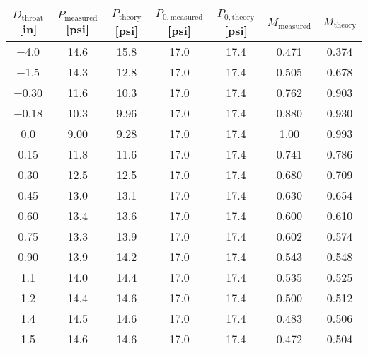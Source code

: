\begin{tabular}{ccccccc}
\toprule
$D_\text{throat}$ [\unit{in}] & $P_\text{measured}$ [\unit{psi}] & $P_\text{theory}$ [\unit{psi}] & $P_{0,\text{measured}}$ [\unit{psi}] & $P_{0,\text{theory}}$ [\unit{psi}] & $M_\text{measured}$ & $M_\text{theory}$ \\
\midrule
\num{-4.0} & \num{14.6} & \num{15.8} & \num{17.0} & \num{17.4} & \num{0.471} & \num{0.374} \\ 
\num{-1.5} & \num{14.3} & \num{12.8} & \num{17.0} & \num{17.4} & \num{0.505} & \num{0.678} \\ 
\num{-0.30} & \num{11.6} & \num{10.3} & \num{17.0} & \num{17.4} & \num{0.762} & \num{0.903} \\ 
\num{-0.18} & \num{10.3} & \num{9.96} & \num{17.0} & \num{17.4} & \num{0.880} & \num{0.930} \\ 
\num{0.0} & \num{9.00} & \num{9.28} & \num{17.0} & \num{17.4} & \num{1.00} & \num{0.993} \\ 
\num{0.15} & \num{11.8} & \num{11.6} & \num{17.0} & \num{17.4} & \num{0.741} & \num{0.786} \\ 
\num{0.30} & \num{12.5} & \num{12.5} & \num{17.0} & \num{17.4} & \num{0.680} & \num{0.709} \\ 
\num{0.45} & \num{13.0} & \num{13.1} & \num{17.0} & \num{17.4} & \num{0.630} & \num{0.654} \\ 
\num{0.60} & \num{13.4} & \num{13.6} & \num{17.0} & \num{17.4} & \num{0.600} & \num{0.610} \\ 
\num{0.75} & \num{13.3} & \num{13.9} & \num{17.0} & \num{17.4} & \num{0.602} & \num{0.574} \\ 
\num{0.90} & \num{13.9} & \num{14.2} & \num{17.0} & \num{17.4} & \num{0.543} & \num{0.548} \\ 
\num{1.1} & \num{14.0} & \num{14.4} & \num{17.0} & \num{17.4} & \num{0.535} & \num{0.525} \\ 
\num{1.2} & \num{14.4} & \num{14.6} & \num{17.0} & \num{17.4} & \num{0.500} & \num{0.512} \\ 
\num{1.4} & \num{14.5} & \num{14.6} & \num{17.0} & \num{17.4} & \num{0.483} & \num{0.506} \\ 
\num{1.5} & \num{14.6} & \num{14.6} & \num{17.0} & \num{17.4} & \num{0.472} & \num{0.504} \\ 
\bottomrule
\end{tabular}